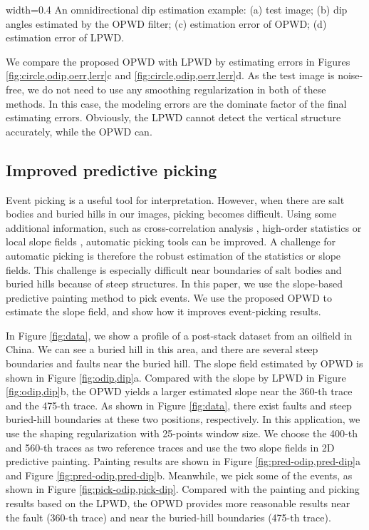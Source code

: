 {width=0.4\textwidth}{
An omnidirectional dip estimation example:
(a) test image;
(b) dip angles estimated by the OPWD filter;
(c) estimation error of OPWD;
(d) estimation error of LPWD.
}


We compare the proposed OPWD with LPWD by 
estimating errors in Figures
\ref{fig:circle,odip,oerr,lerr}c and \ref{fig:circle,odip,oerr,lerr}d.
As the test image is noise-free, 
we do not need to use any smoothing regularization 
in both of these methods.
In this case, 
the modeling errors are the dominate factor of the final estimating errors.
Obviously, the LPWD cannot detect 
the vertical structure accurately,
while the OPWD can. 


\subsection{Improved predictive  picking}

Event picking is a useful tool for interpretation.
However, when there are
salt bodies and buried hills in our images,
picking becomes difficult.
Using some additional information,
such as cross-correlation analysis \cite[]{yung:1947},
high-order statistics \cite[]{GPR:GPR231}
or local slope fields \cite[]{fomel:A25},
automatic picking tools can be improved.
A challenge for automatic picking is 
therefore the robust estimation of the statistics 
or slope fields.
This challenge 
is especially difficult near boundaries of salt bodies and buried hills 
because of steep structures. 
In this paper, we use the slope-based predictive painting method 
\cite[]{fomel:A25} to pick events.
We use the proposed OPWD to estimate the slope field,
and show how it improves event-picking results.


In Figure \ref{fig:data},
we show a profile of a post-stack dataset from an
oilfield in China.
We can see a buried hill in this area,
and there are several steep boundaries and faults 
near the buried hill.
The slope field estimated by OPWD is shown in Figure \ref{fig:odip,dip}a.
Compared with the slope by LPWD in Figure \ref{fig:odip,dip}b,
the OPWD yields a larger estimated slope
near the 360-th trace and the 475-th trace.
As shown in Figure \ref{fig:data}, 
there exist faults and steep buried-hill boundaries 
at these two positions, respectively.
In this application, we use the shaping regularization with 
25-points window size.
We choose the 400-th and 560-th traces
as two reference traces 
and use the two slope fields in 2D predictive painting.
Painting results are 
shown in Figure \ref{fig:pred-odip,pred-dip}a
and Figure \ref{fig:pred-odip,pred-dip}b.
Meanwhile, we pick some of the events,
as shown in Figure \ref{fig:pick-odip,pick-dip}.
Compared with the painting and picking results based on the LPWD,
the OPWD provides more reasonable results 
near the fault (360-th trace) and near 
the buried-hill boundaries (475-th trace).

